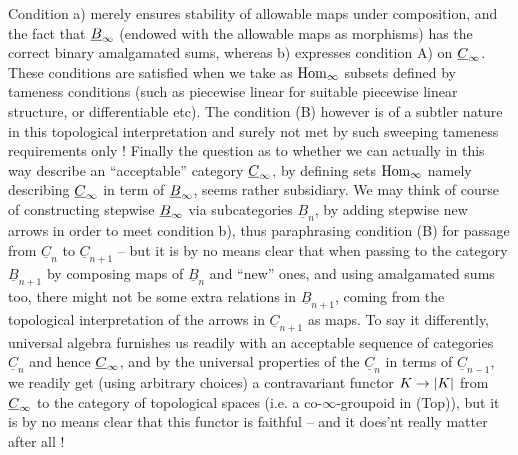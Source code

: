 Condition a) merely ensures stability of allowable maps under composition, and the fact that $\underline{B}_{\infty}$ (endowed with the allowable maps as morphisms) has the correct binary amalgamated sums, whereas b) expresses condition A) on $\underline{C}_{\infty}$. These conditions are satisfied when we take as $\operatorname{Hom}_{\infty}$ subsets defined by tameness conditions (such as piecewise linear for suitable piecewise linear structure, or differentiable etc). The condition (B) however is of a subtler nature in this topological interpretation and surely not met by such sweeping tameness requirements only ! Finally the question as to whether we can actually in this way describe an ``acceptable'' category $\underline{C}_{\infty}$, by defining sets $\operatorname{Hom}_{\infty}$ namely describing $\underline{C}_{\infty}$ in term of $\underline{B}_{\infty}$, seems rather subsidiary. We may think of course of constructing stepwise $\underline{B}_{\infty}$ via subcategories $\underline{B}_n$, by adding stepwise new arrows in order to meet condition b), thus paraphrasing condition (B) for passage  from $\underline{C}_n$ to $\underline{C}_{n+1}$ -- but it is by no means clear that when passing to the category $\underline{B}_{n+1}$ by composing  maps of $\underline{B}_n$ and ``new'' ones, and using amalgamated sums too, there might not be some  extra relations  in $\underline{B}_{n+1}$, coming from the topological interpretation of the arrows in $\underline{C}_{n+1}$ as maps. To say it differently, universal algebra furnishes us readily with an acceptable sequence of categories $\underline{C}_n$ and hence $\underline{C}_{\infty}$, and by the universal properties of the $\underline{C}_n$ in terms of $\underline{C}_{n-1}$, we readily get (using arbitrary choices) a contravariant functor $K\to|K|$ from $\underline{C}_{\infty}$ to the category of topological spaces (i.e. a co-$\infty$-groupoid in (Top)), but it is by no means clear that this functor is faithful -- and it does'nt really matter after all !


